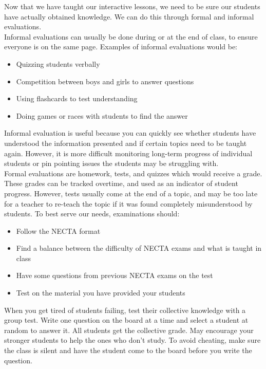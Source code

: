 Now that we have taught our interactive lessons, we need to be sure our students have actually obtained knowledge.  We can do this through formal and informal evaluations.\\
  
Informal evaluations can usually be done during or at the end of class, to ensure everyone is on the same page.  Examples of informal evaluations would be:

\begin{itemize}
 \item Quizzing students verbally
 \item Competition between boys and girls to answer questions
 \item Using flashcards to test understanding
 \item Doing games or races with students to find the answer
\end{itemize}

Informal evaluation is useful because you can quickly see whether students have understood the information presented and if certain topics need to be taught again.  However, it is more difficult monitoring long-term progress of individual students or pin pointing issues the students may be struggling with.\\

Formal evaluations are homework, tests, and quizzes which would receive a grade.  These grades can be tracked overtime, and used as an indicator of student progress.  However, tests usually come at the end of a topic, and may be too late for a teacher to re-teach the topic if it was found completely misunderstood by students. To best serve our needs, examinations should:

\begin{itemize}
 \item Follow the NECTA format
 \item Find a balance between the difficulty of NECTA exams and what is taught in class
 \item Have some questions from previous NECTA  exams on the test
 \item Test on the material you have provided your students
\end{itemize}

When you get tired of students failing, test their collective knowledge with a group test.  Write one question on the board at a time and select a student at random to answer it.  All students get the collective grade.  May encourage your stronger students to help the ones who don't study.  To avoid cheating, make sure the class is silent and have the student come to the board before you write the question.\\

